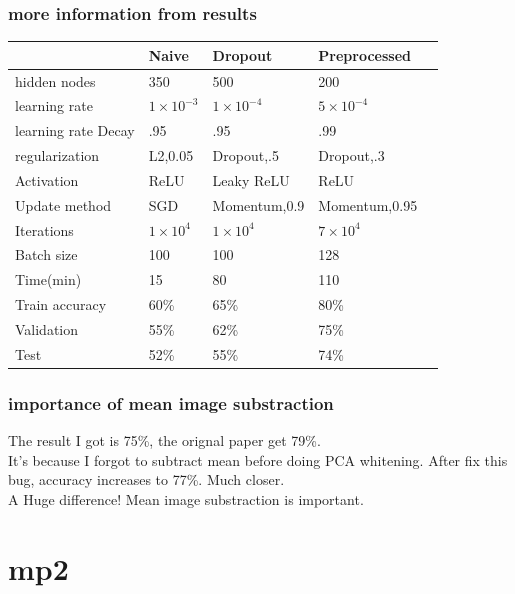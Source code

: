 \documentclass{beamer}
\begin{document}
\begin{frame}
\frametitle{more information from results}
    \begin{table}
    	\centering
    	\begin{tabular}{lllll}
    	\toprule
				& Naive & Dropout & Preprocessed & \\
				\midrule
	  hidden nodes    & 350   & 500        & 200 & \\
	  learning rate & $1\times10^{-3}$   & $1\times10^{-4}$       & $5\times10^{-4}$ &  \\
	  learning rate Decay & .95   & .95       & .99 &  \\
	  regularization & L2,0.05  & Dropout,.5       & Dropout,.3 &  \\
	  Activation  & ReLU  & Leaky ReLU       & ReLU &  \\
	  Update method  & SGD  & Momentum,0.9       & Momentum,0.95   &  \\
	  Iterations & $1\times10^{4}$  & $1\times10^{4}$       & $7\times10^{4}$ &  \\    		
	  Batch size & 100  & 100       & 128 &  \\    		
	  Time(min)  & 15  & 80       & 110 &     		\\
	  Train accuracy  & 60\%  & 65\%       & 80\% & \\
			Validation  & 55\%  & 62\%       & 75\% &     	\\	
    		Test  & 52\%  & 55\%       & 74\% &     		
    	\end{tabular}
    \end{table}
\end{frame}

\begin{frame}
\frametitle{importance of mean image substraction}
The result I got is 75\%, the orignal paper get 79\%. \\
It's because I forgot to subtract mean before doing PCA whitening. 
After fix this bug, accuracy increases to 77\%. Much closer. \\ \phantom 
A Huge difference! Mean image substraction is important.
\end{frame}


\section{mp2}
\begin{frame}
\tableofcontents
\end{frame}
\end{document}

